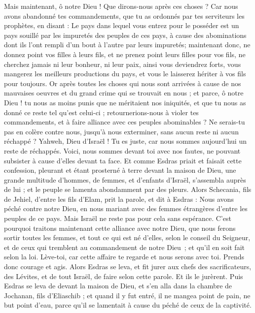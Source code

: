 \begin{multicols}{2}
Mais maintenant, ô notre Dieu ! Que dirons-nous après ces choses ? Car nous avons abandonné tes commandements,
que tu as ordonnés par tes serviteurs les prophètes, en disant : Le pays dans lequel vous entrez pour le posséder est un pays souillé par les impuretés des peuples de ces pays, à cause des abominations dont ils l'ont rempli d’un bout à l'autre par leurs impuretés;
maintenant donc, ne donnez point vos filles à leurs fils, et ne prenez point leurs filles pour vos fils, ne cherchez jamais ni leur bonheur, ni leur paix, ainsi vous deviendrez forts,  vous mangerez les meilleurs productions du pays, et vous le laisserez hériter à vos fils pour toujours.
Or après toutes les choses qui nous sont arrivées à cause de nos mauvaises oeuvres et du grand crime qui se trouvait en nous ; et parce, ô notre Dieu ! tu nous as moins punis que ne méritaient nos iniquités, et que tu nous as donné ce reste tel qu’est celui-ci ;
retournerions-nous à violer tes commandements, et à faire alliance avec ces peuples abominables ? Ne serais-tu pas en colère contre nous, jusqu'à nous exterminer, sans aucun reste ni aucun réchappé ?
Yahweh, Dieu d'Israël ! Tu es juste, car nous sommes aujourd'hui un reste de réchappés. Voici, nous sommes devant toi avec nos fautes, ne pouvant subsister à cause d’elles devant ta face.
\VerseOne{}Et comme Esdras priait et faisait cette confession, pleurant et étant prosterné à terre devant la maison de Dieu, une grande multitude d'hommes, de femmes, et d’enfants d'Israël, s'assembla auprès de lui ; et le peuple se lamenta abondamment par des pleurs.
Alors Schecania, fils de Jehiel, d'entre les fils d’Elam, prit la parole, et dit à Esdras : Nous avons péché contre notre Dieu, en nous mariant avec des femmes étrangères d'entre les peuples de ce pays. Mais Israël ne reste pas pour cela sans espérance.
C’est pourquoi traitons maintenant cette alliance avec notre Dieu, que nous ferons sortir toutes les femmes, et tout ce qui est né d’elles, selon le conseil du Seigneur, et de ceux qui tremblent au commandement de notre Dieu ; et qu’il en soit fait selon la loi.
Lève-toi, car cette affaire te regarde et nous serons avec toi. Prends donc courage et agis.
Alors Esdras se leva, et fit jurer aux chefs des sacrificateurs, des Lévites, et de tout Israël, de faire selon cette parole. Et ils le jurèrent.
Puis Esdras se leva de devant la maison de Dieu, et s'en alla dans la chambre de Jochanan, fils d'Eliaschib ; et quand il y fut entré, il ne mangea point de pain, ne but point d'eau, parce qu'il se lamentait à cause du péché de ceux de la captivité.

\end{multicols}

